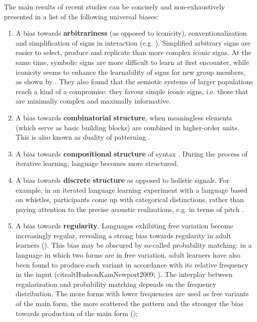 \documentclass[output=paper]{langsci/langscibook}
\begin{document}
The main results of recent studies can be concisely and non-exhaustively presented in a list of the following universal biases: 

\begin{enumerate}
\item 
A bias towards \textbf{arbitrariness} (as opposed to iconicity), conventionalization and simplification of signs in interaction (e.g. \citealt{CaldwellSmith2012}). Simplified arbitrary signs are easier to select, produce and replicate than more complex iconic signs. At the same time, symbolic signs are more difficult to learn at first encounter, while iconicity seems to enhance the learnability of signs for new group members, as shown by \citet{FayEllison2013}. They also found that the semiotic systems of larger populations reach a kind of a compromise: they favour simple iconic signs, i.e. those that are minimally complex and maximally informative.
\item 
A bias towards \textbf{combinatorial} \textbf{structure}, when meaningless elements (which serve as basic building blocks) are combined in higher-order units. This is also known as duality of patterning \citep{Verhoef2012}.
\item 
A bias towards \textbf{compositional} \textbf{structure} of syntax \citep{KirbyEtAl2008}. During the process of iterative learning, language becomes more structured.
\item 
A bias towards \textbf{discrete} \textbf{structure} as opposed to holistic signals. For example, in an iterated language learning experiment with a language based on whistles, participants come up with categorical distinctions, rather than paying attention to the precise acoustic realizations, e.g. in terms of pitch \citep{Verhoef2012}.
\item 
A bias towards \textbf{regularity}. Languages exhibiting free variation become increasingly regular, revealing a strong bias towards regularity in adult learners (\citealt{SmithWonnacott2010}). This bias may be obscured by so-called probability matching: in a language in which two forms are in free variation, adult learners have also been found to produce each variant in accordance with its relative frequency in the input (citealt{HudsonKamNewport2009}; \citealt{WonnacottNewport2005}). The interplay between regularization and probability matching depends on the frequency distribution. The more forms with lower frequencies are used as free variants of the main form, the more scattered the pattern and the stronger the bias towards production of the main form (\citealt{HudsonKamNewport2009});

\end{enumerate}
\end{document}
